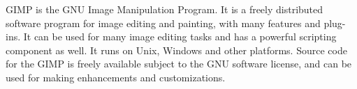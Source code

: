 GIMP is the GNU Image Manipulation Program. It is a freely distributed
software program for image editing and painting, with many features and plug-ins. It can be used for many image editing tasks and has a powerful scripting component as well.  It runs on Unix, Windows and other platforms. Source code for the GIMP is freely available subject to the GNU software license, and can be used for making enhancements and customizations.  

